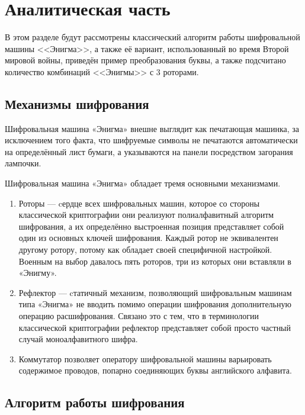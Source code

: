 \chapter{Аналитическая часть}

В этом разделе будут рассмотрены классический алгоритм работы шифровальной машины <<Энигма>>, а также её вариант, использованный во время Второй мировой войны, приведён пример преобразования буквы, а также подсчитано количество комбинаций <<Энигмы>> с 3 роторами.


\section{Механизмы шифрования}

Шифровальная машина «Энигма» внешне выглядит как печатающая машинка, за исключением того факта, что шифруемые символы не печатаются автоматически на определённый лист бумаги, а указываются на панели посредством загорания лампочки.

Шифровальная машина «Энигма» обладает тремя основными механизмами.
\begin{enumerate}
	\item Роторы --- cердце всех шифровальных машин, которое со стороны классической криптографии они реализуют полиалфавитный алгоритм шифрования, а их определённо выстроенная позиция представляет собой один из основных ключей шифрования. 
	Каждый ротор не эквивалентен другому ротору, потому как обладает своей специфичной настройкой. Военным на выбор давалось пять роторов, три из которых они вставляли в «Энигму».
	\item Рефлектор --- cтатичный механизм, позволяющий шифровальным машинам типа «Энигма» не вводить помимо операции шифрования дополнительную операцию расшифрования. Связано это с тем, что в терминологии классической криптографии рефлектор представляет собой просто частный случай моноалфавитного шифра.
	\item Коммутатор позволяет оператору шифровальной машины варьировать содержимое проводов, попарно соединяющих буквы английского алфавита.
\end{enumerate}

\section{Алгоритм работы шифрования}

